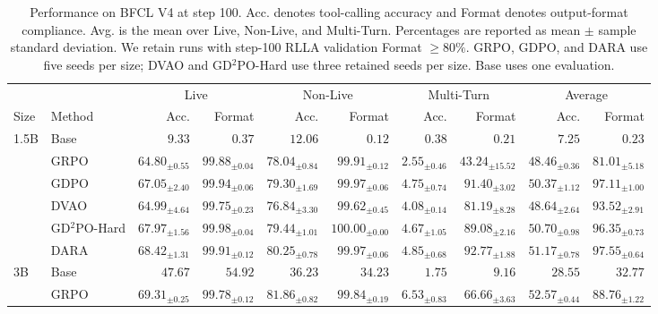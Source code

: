 \begin{table}[t]
\centering
\caption{Performance on BFCL V4 at step 100. Acc. denotes tool-calling accuracy and Format denotes output-format compliance. Avg. is the mean over Live, Non-Live, and Multi-Turn. Percentages are reported as mean $\pm$ sample standard deviation. We retain runs with step-100 RLLA validation Format $\geq80\%$. GRPO, GDPO, and DARA use five seeds per size; DVAO and GD$^2$PO-Hard use three retained seeds per size. Base uses one evaluation.}
\label{tab:bfcl-v4}
\setlength{\tabcolsep}{4pt}
\small
\begin{tabular}{llrrrrrrrr}
\toprule
 & & \multicolumn{2}{c}{Live} & \multicolumn{2}{c}{Non-Live} & \multicolumn{2}{c}{Multi-Turn} & \multicolumn{2}{c}{Average} \\
\cmidrule(lr){3-4}\cmidrule(lr){5-6}\cmidrule(lr){7-8}\cmidrule(lr){9-10}
Size & Method & Acc. & Format & Acc. & Format & Acc. & Format & Acc. & Format \\
\midrule
1.5B & Base & $9.33$ & $0.37$ & $12.06$ & $0.12$ & $0.38$ & $0.21$ & $7.25$ & $0.23$ \\
 & GRPO & $64.80_{\pm 0.55}$ & $99.88_{\pm 0.04}$ & $78.04_{\pm 0.84}$ & $99.91_{\pm 0.12}$ & $2.55_{\pm 0.46}$ & $43.24_{\pm 15.52}$ & $48.46_{\pm 0.36}$ & $81.01_{\pm 5.18}$ \\
 & GDPO & $67.05_{\pm 2.40}$ & $99.94_{\pm 0.06}$ & $79.30_{\pm 1.69}$ & $99.97_{\pm 0.06}$ & $4.75_{\pm 0.74}$ & $91.40_{\pm 3.02}$ & $50.37_{\pm 1.12}$ & $97.11_{\pm 1.00}$ \\
 & DVAO & $64.99_{\pm 4.64}$ & $99.75_{\pm 0.23}$ & $76.84_{\pm 3.30}$ & $99.62_{\pm 0.45}$ & $4.08_{\pm 0.14}$ & $81.19_{\pm 8.28}$ & $48.64_{\pm 2.64}$ & $93.52_{\pm 2.91}$ \\
 & GD$^2$PO-Hard & $67.97_{\pm 1.56}$ & $\mathbf{99.98}_{\pm 0.04}$ & $79.44_{\pm 1.01}$ & $\mathbf{100.00}_{\pm 0.00}$ & $4.67_{\pm 1.05}$ & $89.08_{\pm 2.16}$ & $50.70_{\pm 0.98}$ & $96.35_{\pm 0.73}$ \\
 & DARA & $\mathbf{68.42}_{\pm 1.31}$ & $99.91_{\pm 0.12}$ & $\mathbf{80.25}_{\pm 0.78}$ & $99.97_{\pm 0.06}$ & $\mathbf{4.85}_{\pm 0.68}$ & $\mathbf{92.77}_{\pm 1.88}$ & $\mathbf{51.17}_{\pm 0.78}$ & $\mathbf{97.55}_{\pm 0.64}$ \\
\midrule
3B & Base & $47.67$ & $54.92$ & $36.23$ & $34.23$ & $1.75$ & $9.16$ & $28.55$ & $32.77$ \\
 & GRPO & $69.31_{\pm 0.25}$ & $99.78_{\pm 0.12}$ & $81.86_{\pm 0.82}$ & $99.84_{\pm 0.19}$ & $6.53_{\pm 0.83}$ & $66.66_{\pm 3.63}$ & $52.57_{\pm 0.44}$ & $88.76_{\pm 1.22}$ \\

\end{tabular}
\end{table}
